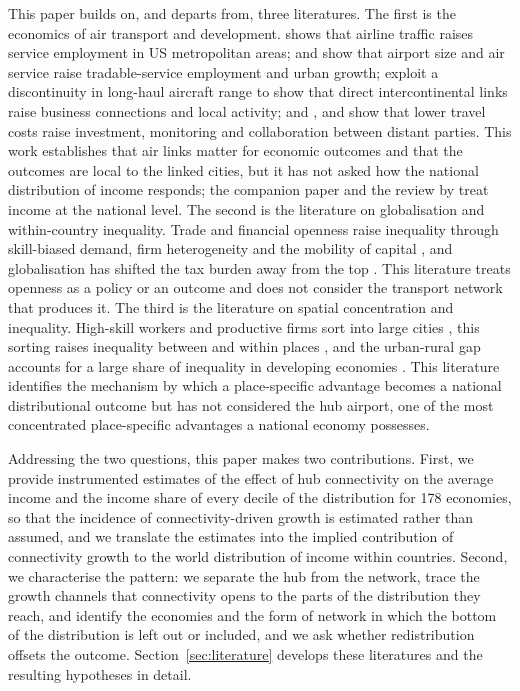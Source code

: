 This paper builds on, and departs from, three literatures. The first is the economics of air transport and development. \citet{Brueckner_2003} shows that airline traffic raises service employment in US metropolitan areas; \citet{Sheard_2014} and \citet{Blonigen_2015} show that airport size and air service raise tradable-service employment and urban growth; \citet{Campante_2018} exploit a discontinuity in long-haul aircraft range to show that direct intercontinental links raise business connections and local activity; and \citet{Giroud_2013}, \citet{Bernstein_2016} and \citet{Catalini_2020} show that lower travel costs raise investment, monitoring and collaboration between distant parties. This work establishes that air links matter for economic outcomes and that the outcomes are local to the linked cities, but it has not asked how the national distribution of income responds; the companion paper \citep{Yue_2026} and the review by \citet{Lenaerts_2021} treat income at the national level. The second is the literature on globalisation and within-country inequality. Trade and financial openness raise inequality through skill-biased demand, firm heterogeneity and the mobility of capital \citep{Feenstra_1997,Jaumotte_2013,Helpman_2017,Furceri_2019,Lang_2023}, and globalisation has shifted the tax burden away from the top \citep{Egger_2019}. This literature treats openness as a policy or an outcome and does not consider the transport network that produces it. The third is the literature on spatial concentration and inequality. High-skill workers and productive firms sort into large cities \citep{Diamond_2016,Gaubert_2018}, this sorting raises inequality between and within places \citep{Moretti_2013,BaumSnow_2018,Fajgelbaum_2020}, and the urban-rural gap accounts for a large share of inequality in developing economies \citep{Young_2013}. This literature identifies the mechanism by which a place-specific advantage becomes a national distributional outcome but has not considered the hub airport, one of the most concentrated place-specific advantages a national economy possesses.

Addressing the two questions, this paper makes two contributions. First, we provide instrumented estimates of the effect of hub connectivity on the average income and the income share of every decile of the distribution for 178 economies, so that the incidence of connectivity-driven growth is estimated rather than assumed, and we translate the estimates into the implied contribution of connectivity growth to the world distribution of income within countries. Second, we characterise the pattern: we separate the hub from the network, trace the growth channels that connectivity opens to the parts of the distribution they reach, and identify the economies and the form of network in which the bottom of the distribution is left out or included, and we ask whether redistribution offsets the outcome. Section~\ref{sec:literature} develops these literatures and the resulting hypotheses in detail.


